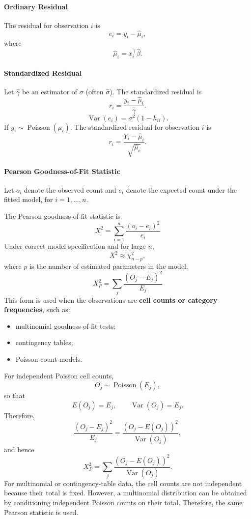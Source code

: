 \documentclass[11pt]{article}
\theoremstyle{definition}
\begin{document}
\paragraph{Ordinary Residual}
The residual for observation $i$ is
\[
e_i = y_i - \hat{\mu}_i ,
\]
where
\[
\hat{\mu}_i = x_i^\top \hat{\beta}.
\]
\paragraph{Standardized Residual}
Let $\hat{\gamma}$ be an estimator of $\sigma$ (often $\hat{\sigma}$).  
The standardized residual is
\[
r_i =
\frac{y_i - \hat{\mu}_i}{\hat{\gamma}}.
\]
\[
\operatorname{Var}(e_i) = \sigma^2 (1 - h_{ii}).
\]
If $y_i\sim \operatorname{Poisson}(\mu_i)$. The standardized residual for observation $i$ is
\[
r_i
=
\frac{Y_i - \hat{\mu}_i}
{\sqrt{\hat{\mu}_i}} .
\]
\paragraph{Pearson Goodness-of-Fit Statistic}
Let $o_i$ denote the observed count and $e_i$ denote the expected count
under the fitted model, for $i=1,\dots,n$.

The Pearson goodness-of-fit statistic is
\[
X^2
=
\sum_{i=1}^n
\frac{(o_i - e_i)^2}{e_i}
\]
Under correct model specification and for large $n$,
\[
X^2 \approx \chi^2_{n-p},
\]
where $p$ is the number of estimated parameters in the model.
\[
\boxed{
X_P^2=\sum_j\frac{(O_j-E_j)^2}{E_j}
}
\]
This form is used when the observations are \textbf{cell counts or category
frequencies}, such as:
\begin{itemize}
    \item multinomial goodness-of-fit tests;
    \item contingency tables;
    \item Poisson count models.
\end{itemize}

For independent Poisson cell counts,
\[
O_j\sim\operatorname{Poisson}(E_j),
\]
so that
\[
E(O_j)=E_j,
\qquad
\operatorname{Var}(O_j)=E_j.
\]
Therefore,
\[
\frac{(O_j-E_j)^2}{E_j}
=
\frac{\left(O_j-E(O_j)\right)^2}
{\operatorname{Var}(O_j)},
\]
and hence
\[
X_P^2
=
\sum_j
\frac{\left(O_j-E(O_j)\right)^2}
{\operatorname{Var}(O_j)}.
\]
For multinomial or contingency-table data, the cell counts are not independent
because their total is fixed. However, a multinomial distribution can be obtained
by conditioning independent Poisson counts on their total. Therefore, the same
Pearson statistic is used.
\end{document}
